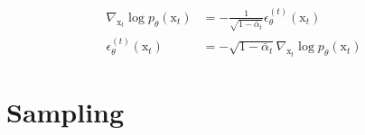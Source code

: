 \begin{equation}\label{eqn:ddpm-to-score}
    \begin{split}
        \nabla_{\mathrm{x}_{t}}\log p_{\theta}(\mathrm{x}_{t}) &= - \frac{1}{\sqrt{1-\bar{\alpha}_{t}}}\epsilon^{(t)}_{\theta}(\mathrm{x}_{t}) \\
        \epsilon_{\theta}^{(t)}(\mathrm{x}_{t}) &= -\sqrt{1-\bar{\alpha}_{t}}\nabla_{\mathrm{x}_{t}}\log p_{\theta}(\mathrm{x}_{t})
    \end{split}
\end{equation}


\section{Sampling}\label{sec:sampling}






